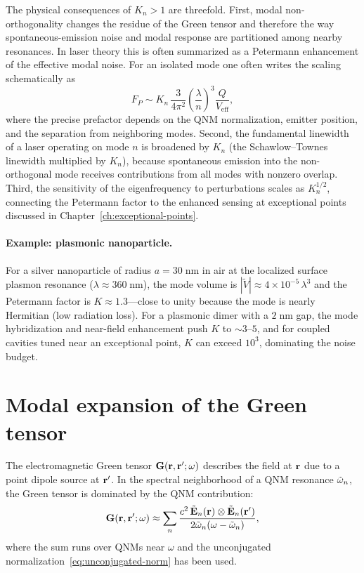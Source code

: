 The physical consequences of $K_n > 1$ are threefold. First, modal
non-orthogonality changes the residue of the Green tensor and therefore
the way spontaneous-emission noise and modal response are partitioned
among nearby resonances. In laser theory this is often summarized as a
Petermann enhancement of the effective modal noise. For an isolated mode
one often writes the scaling schematically as
\begin{equation}
 F_P \sim K_n\,\frac{3}{4\pi^2}\left(\frac{\lambda}{n}\right)^3
 \frac{Q}{V_{\mathrm{eff}}},
 \label{eq:purcell-petermann}
\end{equation}
where the precise prefactor depends on the QNM normalization, emitter
position, and the separation from neighboring modes. Second, the
fundamental linewidth of a laser operating on mode $n$ is
broadened by $K_n$ (the Schawlow--Townes linewidth multiplied by $K_n$),
because spontaneous emission into the non-orthogonal mode receives
contributions from all modes with nonzero overlap. Third, the
sensitivity of the eigenfrequency to perturbations scales as
$K_n^{1/2}$, connecting the Petermann factor to the enhanced sensing at
exceptional points discussed in Chapter~\ref{ch:exceptional-points}.

\paragraph{Example: plasmonic nanoparticle.}
For a silver nanoparticle of radius $a = 30\;$nm in air at the
localized surface plasmon resonance ($\lambda \approx 360\;$nm), the
mode volume is $|\tilde{V}| \approx 4 \times 10^{-5}\,\lambda^3$ and
the Petermann factor is $K \approx 1.3$---close to unity because the
mode is nearly Hermitian (low radiation loss). For a plasmonic dimer
with a $2\;$nm gap, the mode hybridization and near-field enhancement
push $K$ to $\sim 3$--$5$, and for coupled cavities tuned near an
exceptional point, $K$ can exceed $10^3$, dominating the noise budget.


\section{Modal expansion of the Green tensor}
\label{sec:green-tensor}

The electromagnetic Green tensor $\mathbf{G}(\mathbf{r},\mathbf{r}';\omega)$ describes
the field at $\mathbf{r}$ due to a point dipole source at $\mathbf{r}'$. In the
spectral neighborhood of a QNM resonance $\tilde{\omega}_n$, the Green tensor is
dominated by the QNM contribution:
\begin{equation}
 \mathbf{G}(\mathbf{r},\mathbf{r}';\omega)
 \approx \sum_n
 \frac{c^2\,\tilde{\mathbf{E}}_n(\mathbf{r})\otimes\tilde{\mathbf{E}}_n(\mathbf{r}')}
 {2\tilde{\omega}_n(\omega - \tilde{\omega}_n)},
 \label{eq:green-qnm}
\end{equation}
where the sum runs over QNMs near $\omega$ and the unconjugated
normalization~\eqref{eq:unconjugated-norm} has been used.

